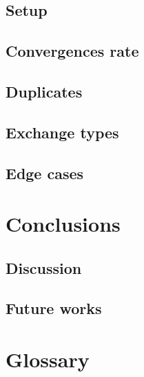 \documentclass[mscthesis]{usiinfthesis}
\begin{document}
\section{Setup}
\section{Convergences rate}
\section{Duplicates}
\section{Exchange types}
\section{Edge cases}

\chapter{Conclusions}
\section{Discussion}
\section{Future works}


%
%
%
%
%
%
\chapter{Glossary} %

%
%



\lipsum
\end{document}
